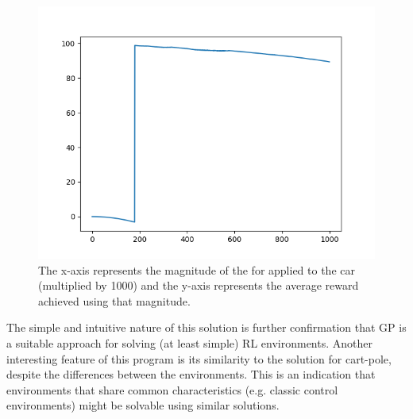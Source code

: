 \begin{figure}[ht]
    \centering
    \includegraphics[width=12cm]{images/mountaincarcont.png}
    \caption{The x-axis represents the magnitude of the for applied to the car (multiplied by 1000) and the y-axis represents the average reward achieved using that magnitude.}
    \label{fig:mountain_car_cont}
\end{figure}

The simple and intuitive nature of this solution is further confirmation that GP is a suitable approach for solving (at least simple) RL environments. Another interesting feature of this program is its similarity to the solution for cart-pole, despite the differences between the environments. This is an indication that environments that share common characteristics (e.g. classic control environments) might be solvable using similar solutions.
